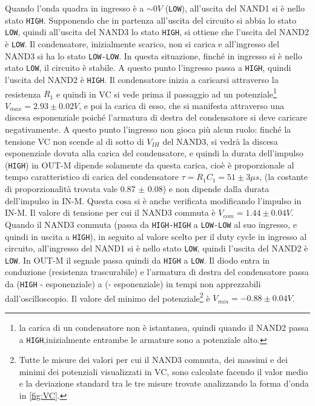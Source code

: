 \documentclass[a4paper,10pt]{article}
\def\code#1{\texttt{#1}}
\begin{document}
Quando l'onda quadra in ingresso è a $\sim 0V$ (\code{LOW}), all'uscita del NAND1 si è nello stato \code{HIGH}. Supponendo che in partenza  all'uscita del circuito si abbia lo stato \code{LOW}, quindi all'uscita del NAND3 lo stato \code{HIGH}, si ottiene che l'uscita del NAND2 è \code{LOW}. Il condensatore, inizialmente scarico, non si carica e all'ingresso del NAND3 si ha lo stato \code{LOW-LOW}. In questa situazione, finché in ingresso si è nello stato \code{LOW}, il circuito è stabile.
\newline
\newline
A questo punto l'ingresso passa a \code{HIGH}, quindi l'uscita del NAND2 è \code{HIGH}. Il condensatore inizia a caricarsi attraverso la resistenza $R_1$ e quindi in VC si vede prima il passaggio ad un potenziale\footnote{la carica di un condensatore non è istantanea, quindi quando il NAND2 passa a \code{HIGH},inizialmente entrambe le armature sono a potenziale alto.} $V_{max} = 2.93\pm 0.02 V$, e poi la carica di esso, che si manifesta attraverso una discesa esponenziale poiché l'armatura di destra del condensatore si deve caricare negativamente.
\newline
\newline
A questo punto l'ingresso non gioca più alcun ruolo: finché la tensione VC non scende al di sotto di $V_{IH}$ del NAND3, si vedrà la discesa esponenziale dovuta alla carica del condensatore, e quindi la durata dell'impulso (\code{HIGH}) in OUT-M dipende solamente da questa carica, cioè è proporzionale al tempo caratteristico di carica del condensatore $\tau = R_1 C_1 = 51 \pm 3 \mu s$, (la costante di proporzionalità trovata vale 0.87 $\pm$ 0.08) e non dipende dalla durata dell'impulso in IN-M. Questa cosa si è anche verificata modificando l'impulso in IN-M. Il valore di tensione per cui il NAND3 commuta è $V_{com} = 1.44\pm 0.04 V$.
\newline
\newline
Quando il NAND3 commuta (passa da \code{HIGH-HIGH} a \code{LOW-LOW} al suo ingresso, e quindi in uscita a \code{HIGH}), in seguito al valore scelto per il duty cycle in ingresso al circuito, all'ingresso del NAND1 si è nello stato \code{LOW}, quindi l'uscita del NAND2 è \code{LOW}. In OUT-M il segnale passa quindi da \code{HIGH} a \code{LOW}. Il diodo entra in conduzione (resistenza trascurabile) e l'armatura di destra del condensatore passa da (\code{HIGH} - esponenziale) a (- esponenziale) in tempi non apprezzabili dall'oscilloscopio. Il valore del minimo del potenziale\footnote{Tutte le misure dei valori per cui il NAND3 commuta, dei massimi e dei minimi dei potenziali visualizzati in VC, sono calcolate facendo il valor medio e la deviazione standard tra le tre misure trovate analizzando la forma d'onda in \cref{fig:VC}.} è $V_{min} = -0.88\pm 0.04 V$.
\end{document}
